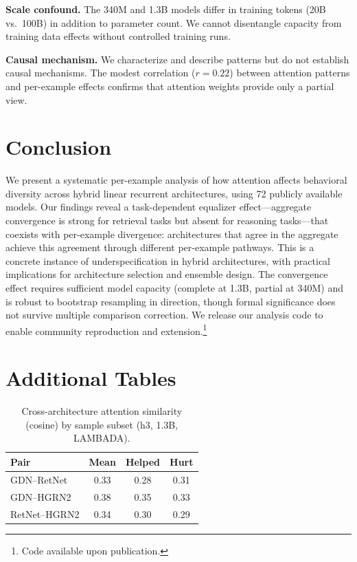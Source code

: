 \documentclass[11pt,twocolumn]{article}
\begin{document}
\textbf{Scale confound.}
The 340M and 1.3B models differ in training tokens (20B vs.\ 100B) in addition to parameter count.
We cannot disentangle capacity from training data effects without controlled training runs.

\textbf{Causal mechanism.}
We characterize and describe patterns but do not establish causal mechanisms.
The modest correlation ($r{=}0.22$) between attention patterns and per-example effects confirms that attention weights provide only a partial view.

\section{Conclusion}

We present a systematic per-example analysis of how attention affects behavioral diversity across hybrid linear recurrent architectures, using 72 publicly available models.
Our findings reveal a task-dependent equalizer effect---aggregate convergence is strong for retrieval tasks but absent for reasoning tasks---that coexists with per-example divergence: architectures that agree in the aggregate achieve this agreement through different per-example pathways.
This is a concrete instance of underspecification in hybrid architectures, with practical implications for architecture selection and ensemble design.
The convergence effect requires sufficient model capacity (complete at 1.3B, partial at 340M) and is robust to bootstrap resampling in direction, though formal significance does not survive multiple comparison correction.
We release our analysis code to enable community reproduction and extension.\footnote{Code available upon publication.}

\appendix

\section{Additional Tables}

\begin{table}[h]
\centering
\small
\caption{Cross-architecture attention similarity (cosine) by sample subset (h3, 1.3B, LAMBADA).}\label{tab:attn-sim}
\begin{tabular}{@{}lccc@{}}
\toprule
\textbf{Pair} & \textbf{Mean} & \textbf{Helped} & \textbf{Hurt} \\
\midrule
GDN--RetNet & 0.33 & 0.28 & 0.31 \\
GDN--HGRN2 & 0.38 & 0.35 & 0.33 \\
RetNet--HGRN2 & 0.34 & 0.30 & 0.29 \\
\bottomrule
\end{tabular}
\end{table}
\end{document}
